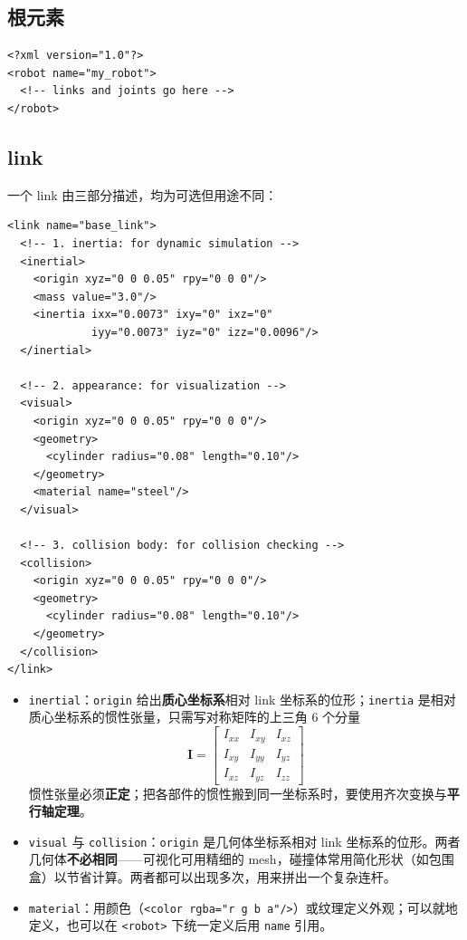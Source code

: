 \subsection{根元素}

\begin{lstlisting}[style=xml]
<?xml version="1.0"?>
<robot name="my_robot">
  <!-- links and joints go here -->
</robot>
\end{lstlisting}

\subsection{link}

一个 link 由三部分描述，均为可选但用途不同：

\begin{lstlisting}[style=xml]
<link name="base_link">
  <!-- 1. inertia: for dynamic simulation -->
  <inertial>
    <origin xyz="0 0 0.05" rpy="0 0 0"/>
    <mass value="3.0"/>
    <inertia ixx="0.0073" ixy="0" ixz="0"
             iyy="0.0073" iyz="0" izz="0.0096"/>
  </inertial>

  <!-- 2. appearance: for visualization -->
  <visual>
    <origin xyz="0 0 0.05" rpy="0 0 0"/>
    <geometry>
      <cylinder radius="0.08" length="0.10"/>
    </geometry>
    <material name="steel"/>
  </visual>

  <!-- 3. collision body: for collision checking -->
  <collision>
    <origin xyz="0 0 0.05" rpy="0 0 0"/>
    <geometry>
      <cylinder radius="0.08" length="0.10"/>
    </geometry>
  </collision>
</link>
\end{lstlisting}

\begin{itemize}
	\item \texttt{inertial}：\texttt{origin} 给出\textbf{质心坐标系}相对 link 坐标系的位形；\texttt{inertia} 是相对质心坐标系的惯性张量，只需写对称矩阵的上三角 6 个分量
	\begin{equation}
		\label{eq:URDF:惯性张量}
		\boldsymbol{I}=\begin{bmatrix}
			I_{xx} & I_{xy} & I_{xz}\\
			I_{xy} & I_{yy} & I_{yz}\\
			I_{xz} & I_{yz} & I_{zz}
		\end{bmatrix}
	\end{equation}
	惯性张量必须\textbf{正定}；把各部件的惯性搬到同一坐标系时，要使用齐次变换与\textbf{平行轴定理}。
	\item \texttt{visual} 与 \texttt{collision}：\texttt{origin} 是几何体坐标系相对 link 坐标系的位形。两者几何体\textbf{不必相同}——可视化可用精细的 mesh，碰撞体常用简化形状（如包围盒）以节省计算。两者都可以出现多次，用来拼出一个复杂连杆。
	\item \texttt{material}：用颜色（\texttt{<color rgba="r g b a"/>}）或纹理定义外观；可以就地定义，也可以在 \texttt{<robot>} 下统一定义后用 \texttt{name} 引用。
\end{itemize}

